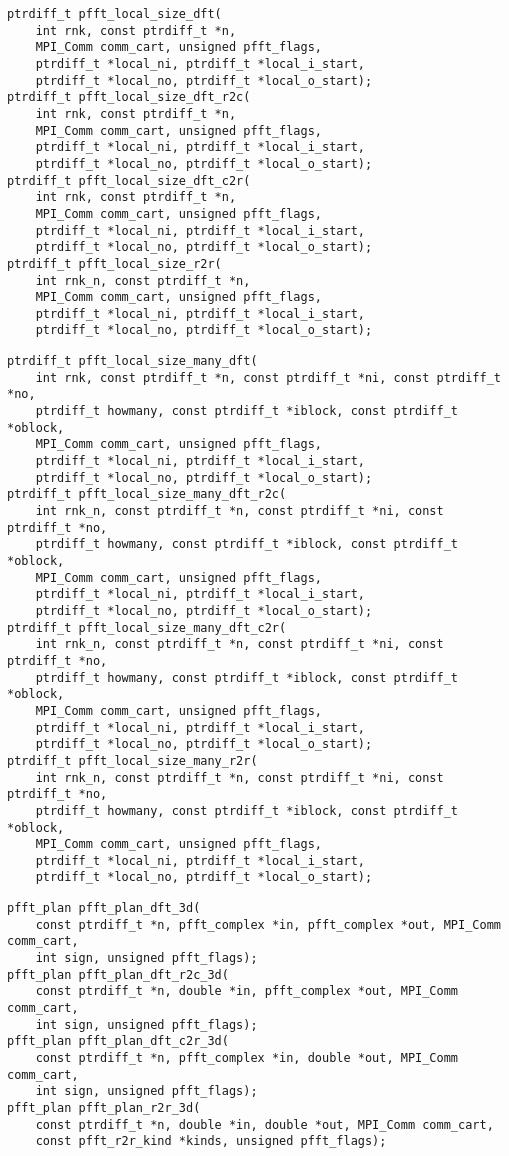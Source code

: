 \begin{lstlisting}
ptrdiff_t pfft_local_size_dft(
    int rnk, const ptrdiff_t *n,
    MPI_Comm comm_cart, unsigned pfft_flags,
    ptrdiff_t *local_ni, ptrdiff_t *local_i_start,
    ptrdiff_t *local_no, ptrdiff_t *local_o_start);
ptrdiff_t pfft_local_size_dft_r2c(
    int rnk, const ptrdiff_t *n,
    MPI_Comm comm_cart, unsigned pfft_flags,
    ptrdiff_t *local_ni, ptrdiff_t *local_i_start,
    ptrdiff_t *local_no, ptrdiff_t *local_o_start);
ptrdiff_t pfft_local_size_dft_c2r(
    int rnk, const ptrdiff_t *n,
    MPI_Comm comm_cart, unsigned pfft_flags,
    ptrdiff_t *local_ni, ptrdiff_t *local_i_start,
    ptrdiff_t *local_no, ptrdiff_t *local_o_start);
ptrdiff_t pfft_local_size_r2r(
    int rnk_n, const ptrdiff_t *n,
    MPI_Comm comm_cart, unsigned pfft_flags,
    ptrdiff_t *local_ni, ptrdiff_t *local_i_start,
    ptrdiff_t *local_no, ptrdiff_t *local_o_start);
\end{lstlisting}

\begin{lstlisting}
ptrdiff_t pfft_local_size_many_dft(
    int rnk, const ptrdiff_t *n, const ptrdiff_t *ni, const ptrdiff_t *no,
    ptrdiff_t howmany, const ptrdiff_t *iblock, const ptrdiff_t *oblock,
    MPI_Comm comm_cart, unsigned pfft_flags,
    ptrdiff_t *local_ni, ptrdiff_t *local_i_start,
    ptrdiff_t *local_no, ptrdiff_t *local_o_start);
ptrdiff_t pfft_local_size_many_dft_r2c(
    int rnk_n, const ptrdiff_t *n, const ptrdiff_t *ni, const ptrdiff_t *no,
    ptrdiff_t howmany, const ptrdiff_t *iblock, const ptrdiff_t *oblock,
    MPI_Comm comm_cart, unsigned pfft_flags,
    ptrdiff_t *local_ni, ptrdiff_t *local_i_start,
    ptrdiff_t *local_no, ptrdiff_t *local_o_start);
ptrdiff_t pfft_local_size_many_dft_c2r(
    int rnk_n, const ptrdiff_t *n, const ptrdiff_t *ni, const ptrdiff_t *no,
    ptrdiff_t howmany, const ptrdiff_t *iblock, const ptrdiff_t *oblock,
    MPI_Comm comm_cart, unsigned pfft_flags,
    ptrdiff_t *local_ni, ptrdiff_t *local_i_start,
    ptrdiff_t *local_no, ptrdiff_t *local_o_start);
ptrdiff_t pfft_local_size_many_r2r(
    int rnk_n, const ptrdiff_t *n, const ptrdiff_t *ni, const ptrdiff_t *no,
    ptrdiff_t howmany, const ptrdiff_t *iblock, const ptrdiff_t *oblock,
    MPI_Comm comm_cart, unsigned pfft_flags,
    ptrdiff_t *local_ni, ptrdiff_t *local_i_start,
    ptrdiff_t *local_no, ptrdiff_t *local_o_start);
\end{lstlisting}

\begin{lstlisting}
pfft_plan pfft_plan_dft_3d(
    const ptrdiff_t *n, pfft_complex *in, pfft_complex *out, MPI_Comm comm_cart,
    int sign, unsigned pfft_flags);
pfft_plan pfft_plan_dft_r2c_3d(
    const ptrdiff_t *n, double *in, pfft_complex *out, MPI_Comm comm_cart,
    int sign, unsigned pfft_flags);
pfft_plan pfft_plan_dft_c2r_3d(
    const ptrdiff_t *n, pfft_complex *in, double *out, MPI_Comm comm_cart,
    int sign, unsigned pfft_flags);
pfft_plan pfft_plan_r2r_3d(
    const ptrdiff_t *n, double *in, double *out, MPI_Comm comm_cart,
    const pfft_r2r_kind *kinds, unsigned pfft_flags);
\end{lstlisting}

